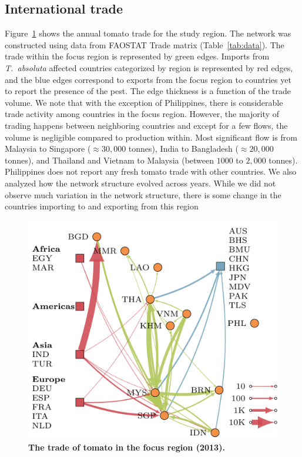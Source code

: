 \documentclass[10pt]{article}
\theoremstyle{definition}
\newcommand{\tuta}{\emph{T.~absoluta}}
\begin{document}
\subsection{International trade} \label{sec:tomnet}
Figure~\ref{fig:tomnet} shows the annual tomato trade for the study region. The
network was constructed using data from FAOSTAT Trade matrix
(Table~\ref{tab:data}).  The trade within the focus region is represented
by green edges. Imports from \tuta{} affected countries categorized by
region is represented by red edges, and the blue edges correspond to
exports from the focus region to countries yet to report the presence of
the pest. The edge thickness is a function of the trade volume. We note
that with the exception of Philippines, there is considerable trade
activity among countries in the focus region. However, the majority of
trading happens between neighboring countries and except for a few flows,
the volume is negligible compared to production within. Most significant
flow is from Malaysia to Singapore ($\approx30,000$ tonnes), India to
Bangladesh ($\approx20,000$ tonnes), and Thailand and Vietnam to Malaysia
(between $1000$ to $2,000$ tonnes). Philippines does not report any fresh
tomato trade with other countries.  We also analyzed how the network
structure evolved across years. While we did not observe much variation in
the network structure, there is some change in the countries importing to
and exporting from this region
\begin{figure}[t]
\centering
\includegraphics[width=.6\textwidth]{../international_trade/results/network_plots/sea_2013_tomato.pdf}
\caption{\textbf{The trade of tomato in the focus region
(2013).}\label{fig:tomnet}}
\end{figure}
\end{document}
